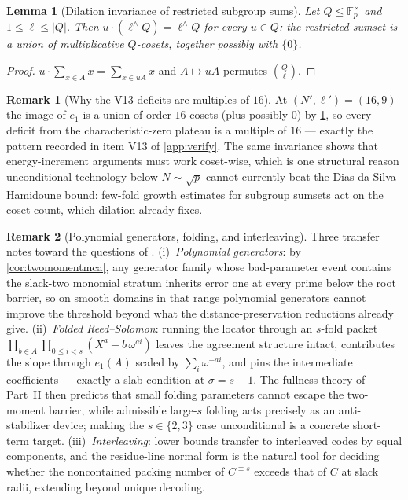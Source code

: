 \documentclass[11pt]{article}
\newtheorem{lemma}[lemma]{Lemma}
\theoremstyle{definition}
\newtheorem{remark}[remark]{Remark}
\newcommand{\F}{\mathbb F}
\begin{document}
\begin{lemma}[Dilation invariance of restricted subgroup sums]\label{lem:dilation}
Let $Q\le\F_p^\times$ and $1\le\ell\le|Q|$.  Then $u\cdot(\ell^{\wedge}Q)=\ell^{\wedge}Q$ for every $u\in Q$: the restricted sumset is a union of multiplicative $Q$-cosets, together possibly with $\{0\}$.
\end{lemma}

\begin{proof}
$u\cdot\sum_{x\in A}x=\sum_{x\in uA}x$ and $A\mapsto uA$ permutes $\binom Q\ell$.
\end{proof}

\begin{remark}[Why the V13 deficits are multiples of $16$]\label{rem:dilationv13}
At $(N',\ell')=(16,9)$ the image of $e_1$ is a union of order-$16$ cosets (plus possibly $0$) by \cref{lem:dilation}, so every deficit from the characteristic-zero plateau is a multiple of $16$ --- exactly the pattern recorded in item V13 of \cref{app:verify}.  The same invariance shows that energy-increment arguments must work coset-wise, which is one structural reason unconditional technology below $N\sim\sqrt p$ cannot currently beat the Dias da Silva--Hamidoune bound: few-fold growth estimates for subgroup sumsets \cite{Shk14} act on the coset count, which dilation already fixes.
\end{remark}

\begin{remark}[Polynomial generators, folding, and interleaving]\label{rem:generators}
Three transfer notes toward the questions of \cite{ABF26}.  (i)~\emph{Polynomial generators}: by \cref{cor:twomomentmca}, any generator family whose bad-parameter event contains the slack-two monomial stratum inherits error one at every prime below the root barrier, so on smooth domains in that range polynomial generators \cite{BCGM25} cannot improve the threshold beyond what the distance-preservation reductions already give.  (ii)~\emph{Folded Reed--Solomon}: running the locator through an $s$-fold packet $\prod_{b\in A}\prod_{0\le i<s}(X^{a}-b\,\omega^{ai})$ leaves the agreement structure intact, contributes the slope through $e_1(A)$ scaled by $\sum_i\omega^{-ai}$, and pins the intermediate coefficients --- exactly a slab condition at $\sigma=s-1$.  The fullness theory of Part~II then predicts that small folding parameters cannot escape the two-moment barrier, while admissible large-$s$ folding \cite{GG25} acts precisely as an anti-stabilizer device; making the $s\in\{2,3\}$ case unconditional is a concrete short-term target.  (iii)~\emph{Interleaving}: lower bounds transfer to interleaved codes by equal components, and the residue-line normal form is the natural tool for deciding whether the noncontained packing number of $C^{\equiv s}$ exceeds that of $C$ at slack radii, extending \cite{DG25} beyond unique decoding.
\end{remark}
\end{document}
